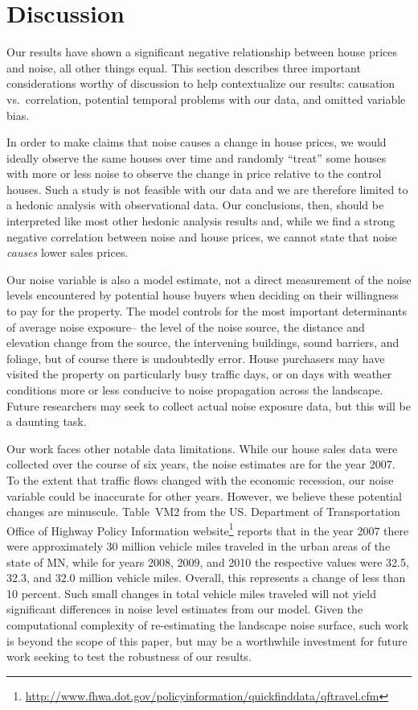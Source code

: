 \documentclass[leqno]{article}\usepackage[]{graphicx}\usepackage[]{color}
\begin{document}
\section{Discussion}\label{Discussion}

Our results have shown a significant negative relationship between house prices and noise, all other things equal. This section describes three important considerations worthy of discussion to help contextualize our results: causation vs.\ correlation, potential temporal problems with our data, and omitted variable bias.

In order to make claims that noise causes a change in house prices, we would ideally observe the same houses over time and randomly ``treat'' some houses with more or less noise to observe the change in price relative to the control houses. Such a study is not feasible with our data and we are therefore limited to a hedonic analysis with observational data. Our conclusions, then, should be interpreted like most other hedonic analysis results and, while we find a strong negative correlation between noise and house prices, we cannot state that noise \emph{causes} lower sales prices. 

Our noise variable is also a model estimate, not a direct measurement of the noise levels encountered by potential house buyers when deciding on their willingness to pay for the property. The model controls for the most important determinants of average noise exposure-- the level of the noise source, the distance and elevation change from the source, the intervening buildings, sound barriers, and foliage, but of course there is undoubtedly error. House purchasers may have visited the property on particularly busy traffic days, or on days with weather conditions more or less conducive to noise propagation across the landscape. Future researchers may seek to collect actual noise exposure data, but this will be a daunting task. 

Our work faces other notable data limitations. While our house sales data were collected over the course of six years, the noise estimates are for the year 2007. To the extent that traffic flows changed with the economic recession, our noise variable could be inaccurate for other years. However, we believe these potential changes are minuscule. Table~VM2 from the US. Department of Transportation Office of Highway Policy Information website\footnote{\url{http://www.fhwa.dot.gov/policyinformation/quickfinddata/qftravel.cfm}} reports that in the year 2007 there were approximately 30 million vehicle miles traveled in the urban areas of the state of MN, while for years 2008, 2009, and 2010 the respective values were 32.5, 32.3, and 32.0 million vehicle miles. Overall, this represents a change of less than 10 percent.  Such small changes in total vehicle miles traveled will not yield significant differences in noise level estimates from our model. Given the computational complexity of re-estimating the landscape noise surface, such work is beyond the scope of this paper, but may be a worthwhile investment for future work seeking to test the robustness of our results.
\end{document}
